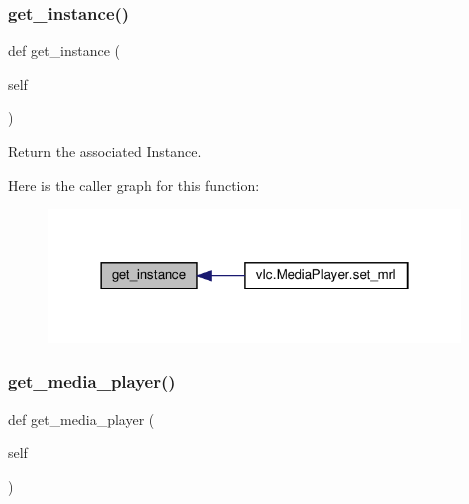 \subsubsection{\texorpdfstring{get\+\_\+instance()}{get\_instance()}}
{\footnotesize\ttfamily def get\+\_\+instance (\begin{DoxyParamCaption}\item[{}]{self }\end{DoxyParamCaption})}

\begin{DoxyVerb}Return the associated Instance.
\end{DoxyVerb}
 Here is the caller graph for this function\+:
\nopagebreak
\begin{figure}[H]
\begin{center}
\leavevmode
\includegraphics[width=310pt]{classvlc_1_1_media_list_player_a56c15bafa43c856366863fc07fc4021f_icgraph}
\end{center}
\end{figure}
\mbox{\label{classvlc_1_1_media_list_player_a19740d569e3e3e0dd5f94695cd2a34f0}} 
\subsubsection{\texorpdfstring{get\+\_\+media\+\_\+player()}{get\_media\_player()}}
{\footnotesize\ttfamily def get\+\_\+media\+\_\+player (\begin{DoxyParamCaption}\item[{}]{self }\end{DoxyParamCaption})}

